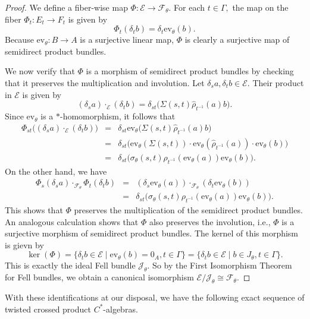 \documentclass[a4paper,11pt,reqno]{amsart}
\theoremstyle{plain}
\theoremstyle{mainthmstyle}
\theoremstyle{named}
\numberwithin{equation}{section}
\newcommand{\Bea}{\begin{eqnarray*}}
\newcommand{\Eea}{\end{eqnarray*}}
\begin{document}
\begin{proof}
We define a fiber-wise map $\Phi : \mathcal{E} \to \mathcal{F}_{\theta}$. For each $t \in \Gamma,$ the map on the fiber $\Phi_t : E_t \to F_t$ is given by
$$\Phi_t(\delta_t b) = \delta_t \mathrm{ev}_{\theta}(b).$$
Because $\mathrm{ev}_{\theta} : B \to A$ is a surjective linear map, $\Phi$ is clearly a surjective map of semidirect product bundles. 

We now verify that $\Phi$ is a morphism of semidirect product bundles by checking that it preserves the multiplication and involution. Let $\delta_s a, \delta_t b \in \mathcal{E}.$ Their product in $\mathcal E$ is given by
$$(\delta_s a) \cdot_{\mathcal{E}} (\delta_t b) = \delta_{st} \big( \Sigma(s, t) \hat{\rho}_{t^{-1}}(a) b \big).$$
Since $\mathrm{ev}_{\theta}$ is a $*$-homomorphism, it follows that
\Bea
\Phi_{st} \big( (\delta_s a) \cdot_{\mathcal{E}} (\delta_t b) \big) & = & \delta_{st} \mathrm{ev}_{\theta} \big( \Sigma(s, t) \hat{\rho}_{t^{-1}}(a) b \big) \\
& = & \delta_{st} \big( \mathrm{ev}_{\theta}(\Sigma(s, t)) \cdot \mathrm{ev}_{\theta}(\hat{\rho}_{t^{-1}}(a)) \cdot \mathrm{ev}_{\theta}(b) \big) \\ & = & \delta_{st} \big( \sigma_{\theta}(s, t) \rho_{t^{-1}}(\mathrm{ev}_{\theta}(a)) \mathrm{ev}_{\theta}(b) \big).
\Eea
On the other hand, we have
\Bea
\Phi_s(\delta_s a) \cdot_{\mathcal{F}_{\theta}} \Phi_t(\delta_t b) & = & (\delta_s \mathrm{ev}_{\theta}(a)) \cdot_{\mathcal{F}_{\theta}} (\delta_t \mathrm{ev}_{\theta}(b)) \\
& = & \delta_{st} \big( \sigma_{\theta}(s, t) \rho_{t^{-1}}(\mathrm{ev}_{\theta}(a)) \mathrm{ev}_{\theta}(b) \big).
\Eea
This shows that $\Phi$ preserves the multiplication of the semidirect product bundles. An analogous calculation shows that $\Phi$ also preserves the involution, i.e., $\Phi$ is a surjective morphism of semidirect product bundles.
The kernel of this morphism is gievn by
$$\ker(\Phi) = \{ \delta_t b \in \mathcal{E} \mid \mathrm{ev}_{\theta}(b) = 0_A, t \in \Gamma \} = \{ \delta_t b \in \mathcal{E} \mid b \in J_{\theta}, t \in \Gamma \}.$$
This is exactly the ideal Fell bundle $\mathcal{J}_{\theta}.$ So by the First Isomorphism Theorem for Fell bundles, we obtain a canonical isomorphism $\mathcal{E} / \mathcal{J}_{\theta} \cong \mathcal{F}_{\theta}.$ 

\end{proof}

With these identifications at our disposal, we have the following exact sequence of twisted crossed product $C^{\ast}$-algebras.
\end{document}
